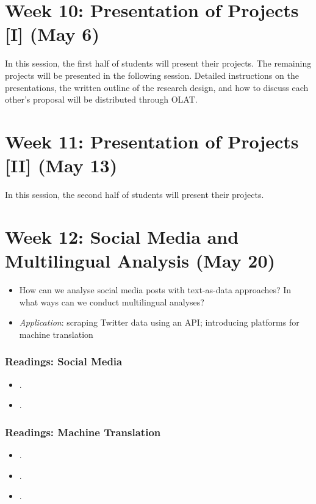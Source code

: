 \documentclass[abstract=on,parskip=full,headings=standardclasses,fontsize=11pt,paper=a4]{scrartcl}
\begin{document}
\section{Week 10: Presentation of Projects [I] (May 6)}

In this session, the first half of students will present their projects. The remaining projects will be presented in the following session. Detailed instructions on the presentations, the written outline of the research design, and how to discuss each other's proposal will be distributed through OLAT.


\section{Week 11: Presentation of Projects [II] (May 13)}

In this session, the second half of students will present their projects. 



\section{Week 12: Social Media and Multilingual Analysis (May 20)}

\begin{itemize}
\renewcommand\labelitemi{--}
\item How can we analyse social media posts with text-as-data approaches? In what ways can we conduct multilingual analyses? 
\item \textit{Application}: scraping Twitter data using an API; introducing platforms for machine translation
\end{itemize}

\subsubsection*{Readings: Social Media}
\begin{itemize}
\item {}.
\item {}.
\end{itemize}

\subsubsection*{Readings: Machine Translation}
\begin{itemize}
\item {}.
\item {}.
\item {}.
\end{itemize}
\end{document}
